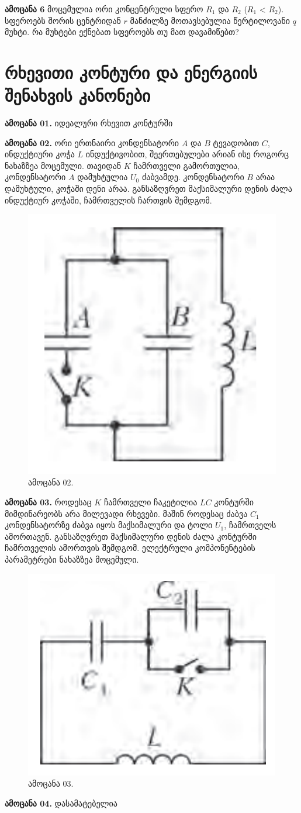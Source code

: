 \documentclass[a4paper]{book}
\begin{document}
\textbf{ამოცანა 6} მოცემულია ორი კონცენტრული სფერო $R_1$ და $R_2$ ($R_1$ < $R_2$). სფეროებს შორის ცენტრიდან $r$ მანძილზე მოთავსებულია წერტილოვანი $q$ მუხტი. რა მუხტები ექნებათ სფეროებს თუ მათ დავამიწებთ?

\section{რხევითი კონტური და ენერგიის შენახვის კანონები}
\textbf{ამოცანა 01.} იდეალური რხევით კონტურში 

\textbf{ამოცანა 02.} ორი ერთნაირი კონდენსატორი $A$ და $B$ ტევადობით $C$, ინდუქტიური კოჭა $L$ ინდუქტივობით, შეერთებულები არიან ისე როგორც ნახაზზეა მოცემული. თავიდან $K$ ჩამრთველი გამორთულია, კონდენსატორი $A$ დამუხტულია $U_0$ ძაბვამდე. კონდენსატორი $B$ არაა დამუხტული, კოჭაში დენი არაა. განსაზღვრეთ მაქსიმალური დენის ძალა ინდუქტიურ კოჭაში, ჩამრთველის ჩართვის შემდგომ.
	\begin{figure}[H]
		\centering
		\includegraphics[width=0.2\columnwidth]{figures/Screenshot 2022-11-11 234359}
		\caption{ამოცანა 02.}
	\end{figure}

\textbf{ამოცანა 03.} როდესაც $K$ ჩამრთველი ჩაკეტილია $LC$ კონტურში მიმდინარეობს არა მილევადი რხევები. მაშინ როდესაც ძაბვა $C_1$ კონდენსატორზე ძაბვა იყოს მაქსიმალური და ტოლი $U_1$, ჩამრთველს ამორთავენ. განსაზღვრეთ მაქსიმალური დენის ძალა კონტურში ჩამრთველის ამორთვის შემდგომ. ელექტრული კომპონენტების პარამეტრები ნახაზზეა მოცემული.
	\begin{figure}[H]
		\centering
		\includegraphics[width=0.2\columnwidth]{figures/Screenshot 2022-11-11 235736}
		\caption{ამოცანა 03.}
	\end{figure}

\textbf{ამოცანა 04.} დასამატებელია
\end{document}
